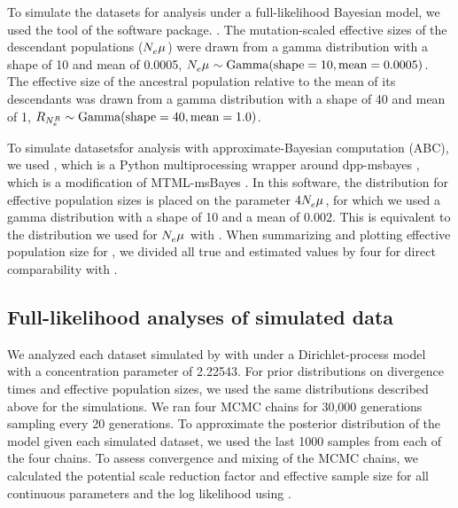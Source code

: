 \documentclass[letterpaper,12pt]{article}
\begin{document}
To simulate the datasets for analysis under a full-likelihood Bayesian model,
we used the \simcoevolity tool of the \ecoevolity software package.
\citep[Version 0.3.2, Commit c128046;][]{Oaks2018ecoevolity,Oaks2018paic}.
The mutation-scaled effective sizes of the descendant populations
($N_{e}^{}\mu_{}$) were drawn from a gamma distribution with a shape of 10
and mean of 0.0005,
$N_{e}^{}{}\mu_{}{} \sim \textrm{Gamma}(\textrm{shape} = 10, \textrm{mean} = 0.0005)$.
The effective size of the ancestral population relative to the mean of
its descendants was drawn from a gamma distribution with a shape of 40 and mean of 1,
$R_{N_{e}^{R{}}} \sim \textrm{Gamma}(\textrm{shape} = 40, \textrm{mean} = 1.0)$.

To simulate datasetsfor analysis with
approximate-Bayesian computation (ABC),
we used \pymsbayes
\citep[Version 0.3.7, Commit 54f720df;][]{Oaks2014dpp},
which is a Python multiprocessing wrapper around dpp-msbayes
\citep{Oaks2014dpp}, which is a modification of
MTML-msBayes \citep{Huang2011}.
In this software, the distribution for effective population sizes is placed
on the parameter $4N_{e}^{}{}\mu_{}{}$, for which we used
a gamma distribution with a shape of 10 and a mean of 0.002.
This is equivalent to the distribution we used for $N_{e}^{}{}\mu_{}{}$ with
\ecoevolity.
When summarizing and plotting effective population size for \pymsbayes, we
divided all true and estimated values by four for direct comparability with
\ecoevolity.

\subsection{Full-likelihood analyses of simulated data}

We analyzed each dataset simulated by \simcoevolity with \ecoeovlity 
\citep[Version 0.3.2, Commit c128046;][]{Oaks2018ecoevolity,Oaks2018paic}
under a Dirichlet-process model with a concentration parameter of 2.22543.
For prior distributions on divergence times and effective population sizes, we
used the same distributions described above for the simulations.
We ran four MCMC chains for 30,000 generations sampling every 20 generations.
To approximate the posterior distribution of the model given each simulated
dataset, we used the last 1000 samples from each of the four chains.
To assess convergence and mixing of the MCMC chains, we calculated the
potential scale reduction factor \citep[PSRF; the square root of Equation 1.1
in][]{Brooks1998} and effective sample size \citep[ESS;][]{Gong2014} for all
continuous parameters and the log likelihood using
\pycoevolity
\citep[Version 0.2.11 Commit 85ea44b;][]{Oaks2018ecoevolity,PycoevolityRepoOnline}.
\end{document}
